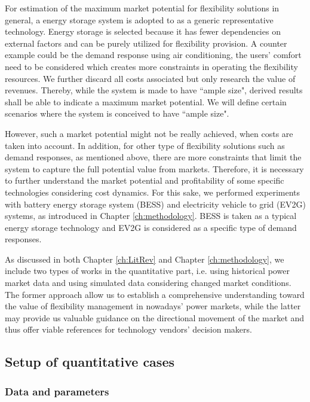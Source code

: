 For estimation of the maximum market potential for flexibility solutions in general, a energy storage system is adopted to as a generic representative technology. Energy storage is selected because it has fewer dependencies on external factors and can be purely utilized for flexibility provision. 
A counter example could be the demand response using air conditioning, the users' comfort need to be considered which creates more constraints in operating the flexibility resources. We further discard all costs associated but only research the value of revenues. Thereby, while the system is made to have ``ample size", derived results shall be able to indicate a maximum market potential. We will define certain scenarios where the system is conceived to have ``ample size".

However, such a market potential might not be really achieved, when costs are taken into account. In addition, for other type of flexibility solutions such as demand responses, as mentioned above, there are more constraints that limit the system to capture the full potential value from markets. Therefore, it is necessary to further understand the market potential and profitability of some specific technologies considering cost dynamics. For this sake, we performed experiments with battery energy storage system (BESS) and electricity vehicle to grid (EV2G) systems, as introduced in  Chapter \ref{ch:methodology}. BESS is taken as a typical energy storage technology and EV2G is considered as a specific type of demand responses. 

As discussed in both Chapter \ref{ch:LitRev} and Chapter \ref{ch:methodology}, we include two types of works in the quantitative part, i.e. using historical power market data and using simulated data considering changed market conditions. The former approach allow us to establish a comprehensive understanding toward the value of flexibility management in nowadays' power markets, while the latter may provide us valuable guidance on the directional movement of the market and thus offer viable references for technology vendors' decision makers.

\subsection{Setup of quantitative cases}
\label{sec:quant-case-setup}
\subsubsection{Data and parameters}
\label{sec:data-parameter}

